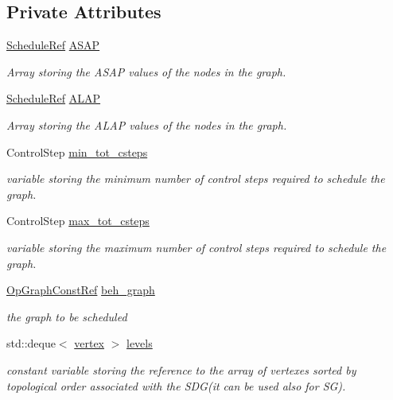 \subsection*{Private Attributes}
\begin{DoxyCompactItemize}
\item 
\hyperlink{schedule_8hpp_af67f402958b3b52a1ec5cc4ce08ae3b9}{Schedule\+Ref} \hyperlink{classASLAP_a990a50136c419bedeb405a1d54b859d3}{A\+S\+AP}
\begin{DoxyCompactList}\small\item\em Array storing the A\+S\+AP values of the nodes in the graph. \end{DoxyCompactList}\item 
\hyperlink{schedule_8hpp_af67f402958b3b52a1ec5cc4ce08ae3b9}{Schedule\+Ref} \hyperlink{classASLAP_a18130c80504e9610e2e7abab7a9de0c3}{A\+L\+AP}
\begin{DoxyCompactList}\small\item\em Array storing the A\+L\+AP values of the nodes in the graph. \end{DoxyCompactList}\item 
Control\+Step \hyperlink{classASLAP_a1659d33460fa862951f6e6e97b88d3c3}{min\+\_\+tot\+\_\+csteps}
\begin{DoxyCompactList}\small\item\em variable storing the minimum number of control steps required to schedule the graph. \end{DoxyCompactList}\item 
Control\+Step \hyperlink{classASLAP_adabce842c92f34d9d94d7c7163359bc4}{max\+\_\+tot\+\_\+csteps}
\begin{DoxyCompactList}\small\item\em variable storing the maximum number of control steps required to schedule the graph. \end{DoxyCompactList}\item 
\hyperlink{op__graph_8hpp_a9a0b240622c47584bee6951a6f5de746}{Op\+Graph\+Const\+Ref} \hyperlink{classASLAP_a1066ae8f856575d11ab7d9a4ec847e9a}{beh\+\_\+graph}
\begin{DoxyCompactList}\small\item\em the graph to be scheduled \end{DoxyCompactList}\item 
std\+::deque$<$ \hyperlink{graph_8hpp_abefdcf0544e601805af44eca032cca14}{vertex} $>$ \hyperlink{classASLAP_aab673e7df4048cecb2cf78d33f104f37}{levels}
\begin{DoxyCompactList}\small\item\em constant variable storing the reference to the array of vertexes sorted by topological order associated with the S\+D\+G(it can be used also for S\+G). \end{DoxyCompactList}\item 

\end{DoxyCompactItemize}
